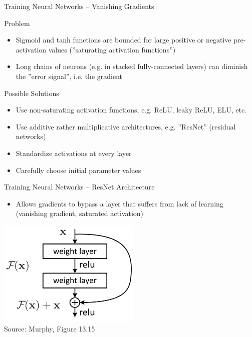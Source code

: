 \documentclass[ignorenonframetext,xcolor=x11names]{beamer}
\begin{document}
\begin{frame}{Training Neural Networks -- Vanishing Gradients }
\begin{block}{Problem}
\begin{itemize}
  \item Sigmoid and tanh functions are bounded for large positive or negative pre-activation values (''saturating activation functions'')
  \item Long chains of neurons (e.g. in stacked fully-connected layers) can diminish the ''error signal'', i.e. the gradient
\end{itemize}
\end{block}
\begin{block}{Possible Solutions}
\begin{itemize}
  \item Use non-saturating activation functions, e.g. ReLU, leaky ReLU, ELU, etc.
  \item Use additive rather multiplicative architectures, e.g. ''ResNet'' (residual networks)
  \item Standardize activations at every layer
  \item Carefully choose initial parameter values
\end{itemize}
\end{block}
\end{frame}


\begin{frame}{Training Neural Networks -- ResNet Architecture}
\begin{itemize}
  \item Allows gradients to bypass a layer that suffers from lack of learning (vanishing gradient, saturated activation)
\end{itemize}
\centering
\includegraphics[height=2in]{screen8.png} \\

\scriptsize Source: Murphy, Figure 13.15
\end{frame}
\end{document}
